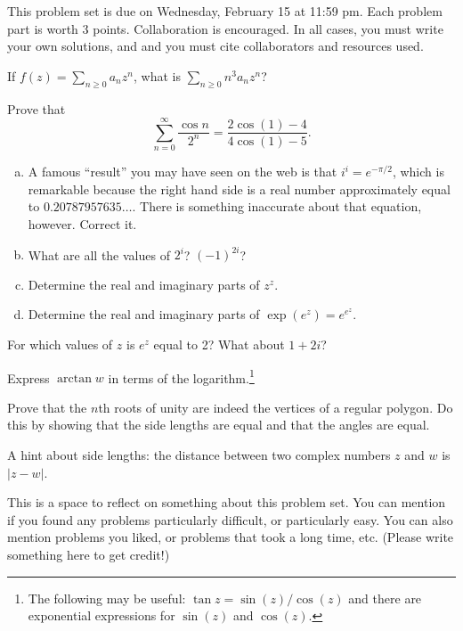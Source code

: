 \maketitle

This problem set is due on Wednesday, February 15 at 11:59 pm. Each problem part is worth 3 points. Collaboration is encouraged. In all cases, you must write your own solutions, and and you must cite collaborators and resources used.

\begin{problem}
  If $f(z)=\sum_{n\geq 0}a_nz^n$, what is $\sum_{n\geq 0}n^3 a_nz^n$?
\end{problem}

\begin{problem}
  Prove that
  \[\sum_{n=0}^\infty\frac{\cos n}{2^n}=\frac{2\cos(1)-4}{4\cos(1)-5}.\]
\end{problem}

\begin{problem}
  \leavevmode\begin{enumerate}[(a)]
    \item A famous ``result'' you may have seen on the web is that $i^i=e^{-\pi/2}$, which is remarkable because the right hand side is a real number approximately equal to $0.20787957635\ldots$. There is something inaccurate about that equation, however. Correct it.
    \item What are all the values of $2^i$? $(-1)^{2i}$?
    \item Determine the real and imaginary parts of $z^z$.
    \item Determine the real and imaginary parts of $\exp(e^z)=e^{e^z}$.
  \end{enumerate}
\end{problem}

\begin{problem}
  For which values of $z$ is $e^z$ equal to 2? What about $1+2i$?
\end{problem}

\begin{problem}
  Express $\arctan w$ in terms of the logarithm.\footnote{The following may be useful: $\tan z=\sin(z)/\cos(z)$ and there are exponential expressions for $\sin(z)$ and $\cos(z)$.}
\end{problem}

\begin{problem}
  Prove that the $n$th roots of unity are indeed the vertices of a regular polygon. Do this by showing that the side lengths are equal and that the angles are equal.
  
  A hint about side lengths: the distance between two complex numbers $z$ and $w$ is $|z-w|$.
\end{problem}

\begin{problem}
  This is a space to reflect on something about this problem set. You can mention if you found any problems particularly difficult, or particularly easy. You can also mention problems you liked, or problems that took a long time, etc. (Please write something here to get credit!)
\end{problem}
